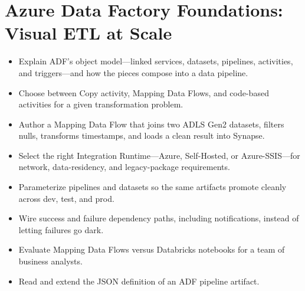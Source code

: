 \chapter{Azure Data Factory Foundations: Visual ETL at Scale}
%
\begin{objectives}
\begin{itemize}
    \item Explain ADF's object model---linked services, datasets, pipelines, activities, and triggers---and how the pieces compose into a data pipeline.
    \item Choose between Copy activity, Mapping Data Flows, and code-based activities for a given transformation problem.
    \item Author a Mapping Data Flow that joins two ADLS Gen2 datasets, filters nulls, transforms timestamps, and loads a clean result into Synapse.
    \item Select the right Integration Runtime---Azure, Self-Hosted, or Azure-SSIS---for network, data-residency, and legacy-package requirements.
    \item Parameterize pipelines and datasets so the same artifacts promote cleanly across dev, test, and prod.
    \item Wire success and failure dependency paths, including notifications, instead of letting failures go dark.
    \item Evaluate Mapping Data Flows versus Databricks notebooks for a team of business analysts.
    \item Read and extend the JSON definition of an ADF pipeline artifact.
\end{itemize}
\end{objectives}

